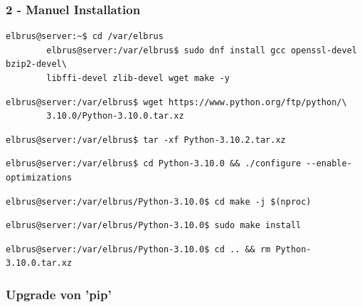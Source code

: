 \documentclass{article}
\begin{document}
	\subsubsection{2 - Manuel Installation}
	
	\lstset{style=commands}
	\begin{lstlisting}[caption={Installieren von benötigten Packeten und Abhängigkeiten.}]
		elbrus@server:~$ cd /var/elbrus
		elbrus@server:/var/elbrus$ sudo dnf install gcc openssl-devel bzip2-devel\
		libffi-devel zlib-devel wget make -y
	\end{lstlisting}
	
	\lstset{style=commands}
	\begin{lstlisting}[caption={Herunterladen der Source Datei.}]
		elbrus@server:/var/elbrus$ wget https://www.python.org/ftp/python/\
		3.10.0/Python-3.10.0.tar.xz
	\end{lstlisting}
	
	\lstset{style=commands}
	\begin{lstlisting}[caption={Extrahieren der installierten Datei.}]
		elbrus@server:/var/elbrus$ tar -xf Python-3.10.2.tar.xz
	\end{lstlisting}
	
	\lstset{style=commands}
	\begin{lstlisting}[caption={Wechseln zu source Verzeichniss. Und ausführen des Konfigurations Scripts.}]
		elbrus@server:/var/elbrus$ cd Python-3.10.0 && ./configure --enable-optimizations
	\end{lstlisting}

	\lstset{style=commands}
	\begin{lstlisting}[caption={Starten des build Prozesses.}]
		elbrus@server:/var/elbrus/Python-3.10.0$ cd make -j $(nproc)
	\end{lstlisting}
	
	\lstset{style=commands}
	\begin{lstlisting}[caption={Installieren von Python.}]
		elbrus@server:/var/elbrus/Python-3.10.0$ sudo make install
	\end{lstlisting}

	\lstset{style=commands}
	\begin{lstlisting}[caption={Löschen der kompremierten Python Datei.}]
		elbrus@server:/var/elbrus/Python-3.10.0$ cd .. && rm Python-3.10.0.tar.xz
	\end{lstlisting}

	\subsubsection{Upgrade von 'pip'}
\end{document}
